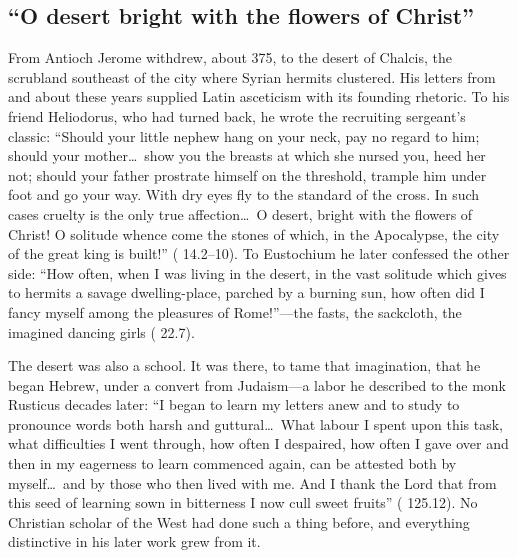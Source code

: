 \subsection{``O desert bright with the flowers of Christ''}

From Antioch Jerome withdrew, about 375, to the desert of Chalcis, the scrubland
southeast of the city where Syrian hermits clustered. His letters from and
about these years supplied Latin asceticism with its founding rhetoric. To his
friend Heliodorus, who had turned back, he wrote the recruiting sergeant's
classic: ``Should your little nephew hang on your neck, pay no regard to him;
should your mother\ldots\ show you the breasts at which she nursed you, heed
her not; should your father prostrate himself on the threshold, trample him
under foot and go your way. With dry eyes fly to the standard of the cross.
In such cases cruelty is the only true affection\ldots\ O desert, bright with
the flowers of Christ! O solitude whence come the stones of which, in the
Apocalypse, the city of the great king is built!'' ( 14.2--10).
To Eustochium he later confessed the other side: ``How often, when I was
living in the desert, in the vast solitude which gives to hermits a savage
dwelling-place, parched by a burning sun, how often did I fancy myself among
the pleasures of Rome!''---the fasts, the sackcloth, the imagined dancing
girls ( 22.7).

The desert was also a school. It was there, to tame that imagination, that he
began Hebrew, under a convert from Judaism---a labor he described to the monk
Rusticus decades later: ``I began to learn my letters anew and to study to
pronounce words both harsh and guttural\ldots\ What labour I spent upon this
task, what difficulties I went through, how often I despaired, how often I
gave over and then in my eagerness to learn commenced again, can be attested
both by myself\ldots\ and by those who then lived with me. And I thank the
Lord that from this seed of learning sown in bitterness I now cull sweet
fruits'' ( 125.12). No Christian scholar of the West had done
such a thing before, and everything distinctive in his later work grew from
it.


